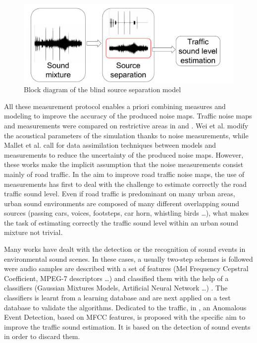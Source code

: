 \documentclass[review,5p,twocolumn,sort&compress,times]{elsarticle}
\begin{document}
\begin{figure}[t]
\centering
\includegraphics[width=.9\linewidth]{figures/bloc_diagram_source_separation.pdf}
\caption{Block diagram of the blind source separation model}
\label{fig:source_separation}
\end{figure}

All these measurement protocol enables a priori combining measures and modeling to improve the accuracy of the produced noise maps. Traffic noise maps and measurements were compared on restrictive areas in \cite{lefebvre2017traffic} and \cite{mioduszewski2011noise}. Wei et al. \cite{wei_dynamic_2016} modify the acoustical parameters of the simulation thanks to noise measurements, while  Mallet et al. \cite{ventura2017estimation} call for data assimilation techniques between models and measurements to reduce the uncertainty of the produced noise maps. However, these works make the implicit assumption that the noise measurements consist mainly of road traffic. In the aim to improve road traffic noise maps, the use of measurements has first to deal with the challenge to estimate correctly the road traffic sound level.
Even if road traffic is predominant on many urban areas, urban sound environments are composed of many different overlapping sound sources (passing cars, voices, footsteps, car horn, whistling birds \dots), what makes the task of estimating correctly the traffic sound level within an urban sound mixture not trivial.

Many works have dealt with the detection \cite{luitel2016sound} or the recognition \cite{defreville_automatic_2006} of sound events in environmental sound scenes. In these cases, a usually two-step schemes is followed were audio samples are described with a set of features (Mel Frequency Cepstral Coefficient, MPEG-7 descriptors \dots) and classified them with the help of a classifiers (Gaussian Mixtures Models, Artificial Neural Network \dots) \cite{chu2008environmental, cowling_comparison_2003}. The classifiers is learnt from a learning database and are next applied on a test database to validate the algorithms. 
Dedicated to the traffic, in \cite{socoro_anomalous_2017}, an Anomalous Event Detection, based on MFCC features, is proposed with the specific aim to improve the traffic sound estimation. It is based on the detection of sound events in order to discard them. 
 
\end{document}
